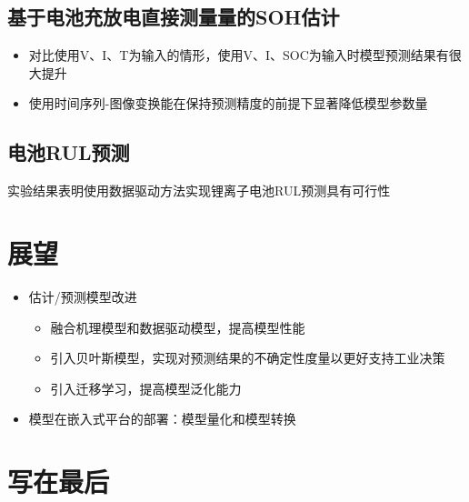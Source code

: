 \documentclass{beamer}
\begin{document}
\subsection{基于电池充放电直接测量量的SOH估计}

\begin{frame}
	\begin{itemize}
		\item 对比使用V、I、T为输入的情形，使用V、I、SOC为输入时模型预测结果有很大提升
		\item 使用时间序列-图像变换能在保持预测精度的前提下显著降低模型参数量
	\end{itemize}
\end{frame}

\subsection{电池RUL预测}

\begin{frame}
	实验结果表明使用数据驱动方法实现锂离子电池RUL预测具有可行性
\end{frame}

\section{展望}

\begin{frame}
	\begin{itemize}
		\item 估计/预测模型改进
			\begin{itemize}
				\item 融合机理模型和数据驱动模型，提高模型性能
				\item 引入贝叶斯模型，实现对预测结果的不确定性度量以更好支持工业决策
				\item 引入迁移学习，提高模型泛化能力
			\end{itemize}
		\item 模型在嵌入式平台的部署：模型量化和模型转换
	\end{itemize}
\end{frame}

\section{写在最后}
\end{document}
